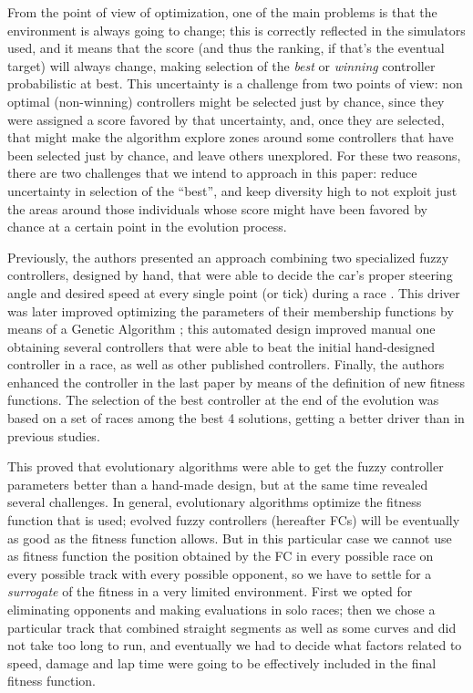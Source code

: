 \documentclass[conference]{IEEEtran}
\begin{document}
From the point of view of optimization, one of the main problems is
that the environment is always going to change; this is correctly
reflected in the simulators used, and it means that the score (and
thus the ranking, if that's the eventual target) will always change,
making selection of the {\em best} or {\em winning} controller
probabilistic at best. This uncertainty is a challenge from two points
of view: non optimal (non-winning) controllers might be selected just
by chance, since they were assigned a score favored by that
uncertainty, and, once they are selected, that might make the
algorithm explore zones around some controllers that have been
selected just by chance, and leave others unexplored. For these two
reasons, there are two challenges that we intend to approach in this
paper: reduce uncertainty in selection of the ``best'', and keep
diversity high to not exploit just the areas around those individuals
whose score might have been favored by chance at a certain point in
the evolution process.

Previously, the authors presented an approach
combining two specialized fuzzy controllers, designed by hand, that
were able to decide the car's proper steering angle and desired speed
at every single point (or tick) during a race \cite{salem_evo17}. This
driver was later improved \cite{salem_evo18} optimizing the parameters of
their membership functions by means of a Genetic Algorithm
\cite{GAs_Goldberg89}; this automated design improved manual one
obtaining several controllers that were able to beat the initial
hand-designed controller in a race, as well as other published
controllers. Finally, the authors enhanced the controller in the last paper \cite{salem_cig2018} by means of the definition of new fitness functions. The selection of the best controller at the end of the evolution was based on a set of races among the best 4 solutions, getting a better driver than in previous studies.

This proved that evolutionary algorithms were able to get the fuzzy
controller parameters better than a hand-made design, but at the same
time revealed several challenges. In general, evolutionary algorithms
optimize the fitness function that is used; evolved fuzzy controllers
(hereafter FCs) will be eventually as good as the fitness function allows. 
But in this particular case we cannot use as fitness function the position
obtained by the FC in every possible race on every possible track with
every possible opponent, so we have to settle for a {\em surrogate} of
the fitness in a very limited environment. First we opted for
eliminating opponents and making evaluations in solo races; then we
chose a particular track that combined straight segments as well as
some curves and did not take too long to run, and eventually we had to
decide what factors related to speed, damage and lap time were going
to be effectively included in the final fitness function. 
\end{document}
